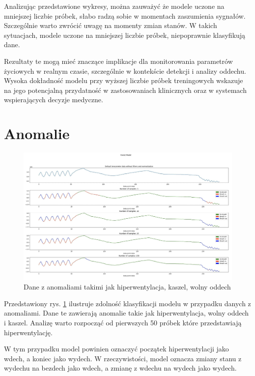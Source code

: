 \documentclass{article}
\begin{document}
Analizując przedstawione wykresy, można zauważyć że modele uczone na mniejszej liczbie próbek, słabo radzą sobie w momentach zaszumienia sygnałów. Szczególnie warto zwrócić uwagę na momenty zmian stanów. W takich sytuacjach, modele uczone na mniejszej liczbie próbek, niepoprawnie klasyfikują dane.

Rezultaty te mogą mieć znaczące implikacje dla monitorowania parametrów życiowych w realnym czasie, szczególnie w kontekście detekcji i analizy oddechu. Wysoka dokładność modelu przy wyższej liczbie próbek treningowych wskazuje na jego potencjalną przydatność w zastosowaniach klinicznych oraz w systemach wspierających decyzje medyczne.

\section{Anomalie}

\begin{figure}[H]
    \centering
    \includegraphics[width=\textwidth]{anomalie.png}
    \caption{Dane z anomaliami takimi jak hiperwentylacja, kaszel, wolny oddech}
    \label{fig:data_chart5}
\end{figure}

Przedstawiony rys. \ref{fig:data_chart5} ilustruje zdolność klasyfikacji modelu w przypadku danych z anomaliami. Dane te zawierają anomalie takie jak hiperwentylacja, wolny oddech i kaszel. Analizę warto rozpocząć od pierwszych 50 próbek które przedstawiają hiperwentylację. 

W tym przypadku model powinien oznaczyć początek hiperwentylacji jako wdech, a koniec jako wydech. W rzeczywistości, model oznacza zmiany stanu z wydechu na bezdech jako wdech, a zmianę z wdechu na wydech jako wydech. 
\end{document}
